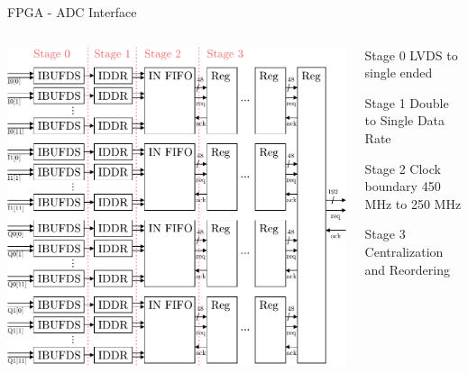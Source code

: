 \documentclass[10pt]{beamer}
\begin{document}
\begin{frame}{FPGA - ADC Interface}
  \begin{columns}[T]
    \begin{column}{.7\textwidth}
      \centering
      \includegraphics[width=\textwidth]{figures/fpga_adc}
    \end{column}
    \begin{column}{.3\textwidth}
      \begin{block}{Stage 0}
        LVDS to single ended
      \end{block}
      \begin{block}{Stage 1}
        Double to Single Data Rate
      \end{block}
      \begin{block}{Stage 2}
        Clock boundary 450 MHz to 250 MHz
      \end{block}
      \begin{block}{Stage 3}
        Centralization and Reordering
      \end{block}
    \end{column}
  \end{columns}
\end{frame}
\end{document}

